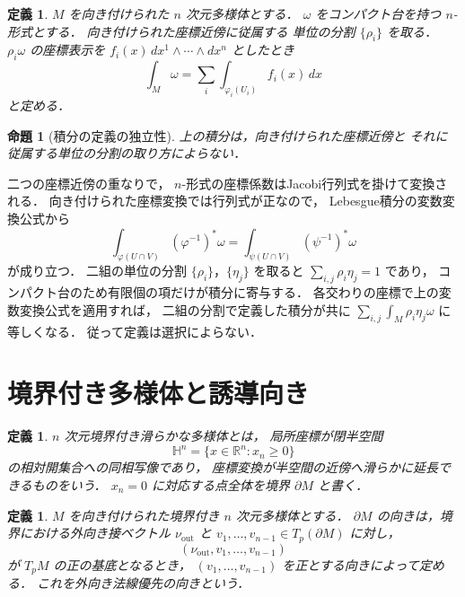 \documentclass[a5paper,10pt,onecolumn]{jsarticle}
\makeatletter
\theoremstyle{mathnotetheorem}
\newtheorem{definition}[theorem]{定義}
\newtheorem{proposition}[theorem]{命題}
\renewcommand{\proofname}{証明}
\renewenvironment{proof}[1][\proofname]{%
  \par\pushQED{\qed}\normalfont\topsep4\p@\@plus2\p@\relax
  \trivlist\item[\hskip\labelsep\bfseries #1]\ignorespaces
}{\popQED\endtrivlist\@endpefalse}
\makeatother
\begin{document}
\begin{definition}
$M$ を向き付けられた $n$ 次元多様体とする．
$\omega$ をコンパクト台を持つ $n$-形式とする．
向き付けられた座標近傍に従属する
単位の分割 $\{\rho_i\}$ を取る．
$\rho_i\omega$ の座標表示を
$f_i(x)\,dx^1\wedge\cdots\wedge dx^n$ としたとき
\[
 \int_M\omega=\sum_i\int_{\varphi_i(U_i)}f_i(x)\,dx
\]
と定める．
\end{definition}

\begin{proposition}[積分の定義の独立性]
\label{prop:integral-independent}
上の積分は，向き付けられた座標近傍と
それに従属する単位の分割の取り方によらない．
\end{proposition}
\begin{proof}
二つの座標近傍の重なりで，
$n$-形式の座標係数はJacobi行列式を掛けて変換される．
向き付けられた座標変換では行列式が正なので，
Lebesgue積分の変数変換公式から
\[
 \int_{\varphi(U\cap V)}(\varphi^{-1})^*\omega
 =\int_{\psi(U\cap V)}(\psi^{-1})^*\omega
\]
が成り立つ．
二組の単位の分割 $\{\rho_i\}$，$\{\eta_j\}$ を取ると
$\sum_{i,j}\rho_i\eta_j=1$ であり，
コンパクト台のため有限個の項だけが積分に寄与する．
各交わりの座標で上の変数変換公式を適用すれば，
二組の分割で定義した積分が共に
$\sum_{i,j}\int_M\rho_i\eta_j\omega$ に等しくなる．
従って定義は選択によらない．
\end{proof}

\section{境界付き多様体と誘導向き}

\begin{definition}
$n$ 次元\emph{境界付き滑らかな多様体}とは，
局所座標が閉半空間
\[
 \mathbb H^n=\{x\in\mathbb R^n:x_n\ge0\}
\]
の相対開集合への同相写像であり，
座標変換が半空間の近傍へ滑らかに延長できるものをいう．
$x_n=0$ に対応する点全体を境界 $\partial M$ と書く．
\end{definition}

\begin{definition}
$M$ を向き付けられた境界付き $n$ 次元多様体とする．
$\partial M$ の向きは，境界における外向き接ベクトル
$\nu_{\mathrm{out}}$ と
$v_1,\dots,v_{n-1}\in T_p(\partial M)$ に対し，
\[
 (\nu_{\mathrm{out}},v_1,\dots,v_{n-1})
\]
が $T_pM$ の正の基底となるとき，
$(v_1,\dots,v_{n-1})$ を正とする向きによって定める．
これを外向き法線優先の向きという．
\end{definition}
\end{document}
